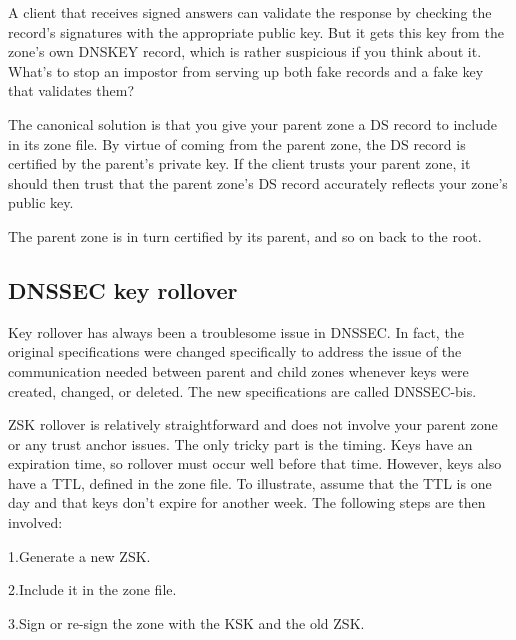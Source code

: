 A client that receives signed answers can validate the response by
checking the record's signatures with the appropriate public key. But it
gets this key from the zone's own DNSKEY record, which is rather
suspicious if you think about it. What's to stop an impostor from
serving up both fake records and a fake key that validates them?

The canonical solution is that you give your parent zone a DS record to
include in its zone file. By virtue of coming from the parent zone, the
DS record is certified by the parent's private key. If the client trusts
your parent zone, it should then trust that the parent zone's DS record
accurately reflects your zone's public key.

The parent zone is in turn certified by its parent, and so on back to
the root.

\protect\hypertarget{part0024_split_066.html}{}{}

\hypertarget{part0024_split_066.htmlux5cux23_idContainer1069}{}
\hypertarget{part0024_split_066.htmlux5cux23calibre_pb_65}{%
\subsection[DNSSEC key
rollover]{\texorpdfstring{\protect\hypertarget{part0024_split_066.htmlux5cux23_idTextAnchor946}{}{}DNSSEC
key
rollover}{DNSSEC key rollover}}\label{part0024_split_066.htmlux5cux23calibre_pb_65}}

\protect\hypertarget{part0024_split_066.htmlux5cux23_idIndexMarker2270}{}{}\protect\hypertarget{part0024_split_066.htmlux5cux23_idTextAnchor947}{}{}Key
rollover has always been a troublesome issue in DNSSEC. In fact, the
original specifications were changed specifically to address the issue
of the communication needed between parent and child zones whenever keys
were created, changed, or deleted. The new specifications are called
DNSSEC-bis.

ZSK rollover is relatively straightforward and does not involve your
parent zone or any trust anchor issues. The only tricky part is the
timing. Keys have an expiration time, so rollover must occur well before
that time. However, keys also have a TTL, defined in the zone file. To
illustrate, assume that the TTL is one day and that keys don't expire
for another week. The following steps are then involved:

{1.}Generate a new ZSK.

{2.}Include it in the zone file.

{3.}Sign or re-sign the zone with the KSK and the {old} ZSK.

